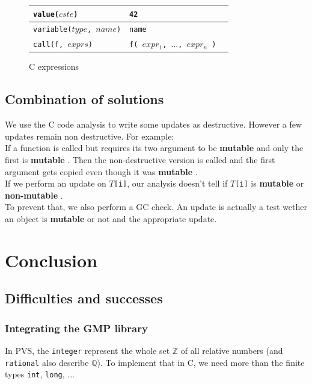 \documentclass[12pt,a4paper,titlepage]{article}
\newcommand{\cl}[1]{\texttt{#1}}
\newcommand{\Z}{\mathbb{Z}}
\newcommand{\Q}{\mathbb{Q}}
\newcommand{\mut}{  \textbf{ mutable } }
\newcommand{\nmut}{ \textbf{ non-mutable } }
\begin{document}
\begin{figure}
\begin{tabular}{|p{50mm}|p{50mm}|p{50mm}|}
\hline
\cl{value($cste$)} & \cl{42} & \\ \hline
\cl{variable($type$, $name$)} & \cl{name} & \\ \hline
\cl{call(f, $exprs$)} & \cl{f( $expr_1$, $...$, $expr_n$ )} & \\ \hline
\end{tabular}
\caption{C expressions}
\end{figure}




\subsection{Combination of solutions}

We use the C code analysis to write some updates as destructive. However a few updates remain non destructive. For example:\\

If a function is called but requires its two argument to be \mut  and only the first is \mut. Then the non-destructive version is called and the first argument gets copied even though it was \mut.\\

If we perform an update on \cl{$T$[i]}, our analysis doesn't tell if \cl{$T$[i]} is \mut or \nmut.\\

To prevent that, we also perform a GC check. An update is actually a test wether an object is \mut or not and the appropriate update.



\newpage
\section{Conclusion}


\subsection{Difficulties and successes}


\subsubsection{Integrating the GMP library}
In PVS, the \texttt{integer} represent the whole set $\Z$ of all relative numbers (and \texttt{rational} also describe $\Q$).
To implement that in C, we need more than the finite types \cl{int}, \cl{long}, ...
\end{document}
